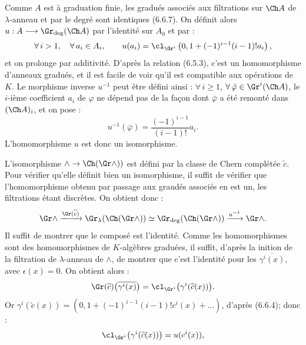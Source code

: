 

Comme \(A\) est à graduation finie, les gradués associés aux filtrations sur \(\Ch A\) de \(\lambda\)-anneau et par le degré sont identiques (6.6.7). On définit alors \(u:A\longrightarrow \Gr_{\deg}(\Ch A)\) par l'identité sur \(A_0\) et par :
\[
  \forall\, i>1,\quad\forall\, a_i\in A_i,\qquad u(a_i)=\cl_{\Gr^i}\left(0,1+(-1)^{i-1}(i-1)!a_i\right),
\]
et on prolonge par additivité. D'après la relation (6.5.3), c'est un homomorphisme d'anneaux gradués, et il est facile de voir qu'il est compatible aux opérations de \(K\). Le morphisme inverse \(u^{-1}\) peut être défini ainsi : \(\forall\, i\ge1\), \(\forall\,\bar\varphi\in\Gr^i(\Ch A)\), le \(i\)-ième coefficient \(a_i\) de \(\varphi\) ne dépend pas de la façon dont \(\bar\varphi\) a été remonté dans \((\Ch A)_i\), et on pose :
\[
  u^{-1}(\bar\varphi)=\frac{(-1)^{i-1}}{(i-1)!}a_i.
\]
L'homomorphisme \(u\) est donc un isomorphisme.

L'isomorphisme \(\mathord{\wedge}\to\Ch(\Gr\mathord{\wedge}))\) est défini par la classe de Chern complétée \(\widetilde c\). Pour vérifier qu'elle définit bien un isomorphisme, il suffit de vérifier que l'homomorphisme obtenu par passage aux graudés associés en est un, les filtrations étant discrètes. On obtient donc :
\[
  \Gr\mathord{\wedge}
   \xrightarrow{\Gr(\widetilde c)}
  \Gr_{\lambda}(\Ch(\Gr\mathord{\wedge}))
   \simeq
  \Gr_{\deg}(\Ch(\Gr\mathord{\wedge}))
   \xrightarrow{u^{-1}}
  \Gr\mathord{\wedge} .
\]
Il suffit de montrer que le composé est l'identité. Comme les homomorphismes sont des homomorphismes de \(K\)-algèbres graduées, il suffit, d'après la \hphantom{déf}inition de la filtration de \(\lambda\)-anneau de \(\mathord{\wedge}\), de montrer que c'est l'identité pour les \(\overline{\gamma^i(x)}\), avec \(\epsilon(x)=0\). On obtient alors :
\[
  \Gr(\widetilde c)\bigl(\overline{\gamma^i(x)}\bigr)
  =
  \cl_{\Gr^i}\bigl(\gamma^i(\widetilde c(x))\bigr).
\]
Or \(\gamma^i(\widetilde c(x))=(0,1+(-1)^{i-1}(i-1)!c^i(x)+\ldots)\), d'après (6.6.4); donc :
\[
  \cl_{\Gr^i}\bigl(\gamma^i(\widetilde c(x))\bigr)=u(c^i(x)),
\]
